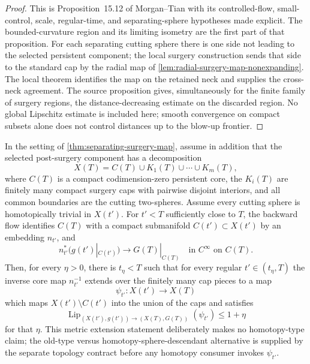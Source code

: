 \begin{proof}
This is Proposition~15.12 of Morgan--Tian with its controlled-flow,
small-control, scale, regular-time, and separating-sphere hypotheses made
explicit.  The bounded-curvature region and its limiting isometry are the
first part of that proposition.  For each separating cutting sphere there is
one side not leading to the selected persistent component; the local surgery
construction sends that side to the standard cap by the radial map of
\ref{lem:radial-surgery-map-nonexpanding}.  The local theorem identifies the
map on the retained neck and supplies the cross-neck agreement.  The source
proposition gives, simultaneously for the finite family of surgery regions,
the distance-decreasing estimate on the discarded region.  No global
Lipschitz estimate is included here; smooth convergence on compact subsets
alone does not control distances up to the blow-up frontier.
\end{proof}

\begin{lemma}
\label{lem:global-surgery-map-lipschitz}
\notready
In the setting of
\ref{thm:separating-surgery-map}, assume in addition that the selected
post-surgery component has a decomposition
\[
 X(T)=C(T)\cup K_1(T)\cup\cdots\cup K_m(T),
\]
where $C(T)$ is a compact codimension-zero persistent core, the $K_i(T)$ are
finitely many compact surgery caps with pairwise disjoint interiors, and all
common boundaries are the cutting two-spheres.  Assume every cutting sphere
is homotopically trivial in $X(t')$.  For $t'<T$ sufficiently close to $T$,
the backward flow identifies $C(T)$ with a compact submanifold
$C(t')\subset X(t')$ by an embedding $n_{t'}$, and
\[
 n_{t'}^{*}\bigl(g(t')|_{C(t')}\bigr)\longrightarrow G(T)|_{C(T)}
 \quad\text{in }C^\infty\text{ on }C(T).
\]
Then, for every $\eta>0$, there is $t_\eta<T$ such that for every regular
$t'\in(t_\eta,T)$ the inverse core map $n_{t'}^{-1}$ extends over the
finitely many cap pieces to a map
\[
 \psi_{t'}\colon X(t')\longrightarrow X(T)
\]
which maps $X(t')\setminus C(t')$ into the union of the caps and satisfies
\[
 \operatorname{Lip}_{(X(t'),g(t'))\to(X(T),G(T))}(\psi_{t'})\le 1+\eta
\]
for that $\eta$.  This metric extension statement deliberately makes no
homotopy-type claim; the old-type versus homotopy-sphere-descendant
alternative is supplied by the separate topology contract before any
homotopy consumer invokes $\psi_{t'}$.
\end{lemma}

